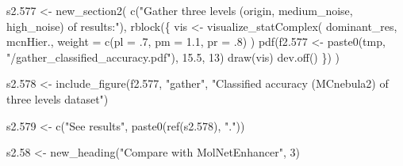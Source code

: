 \documentclass[
]{article}
\newenvironment{Shaded}{\begin{snugshade}}{\end{snugshade}}
\newcommand{\AttributeTok}[1]{\textcolor[rgb]{0.77,0.63,0.00}{#1}}
\newcommand{\DecValTok}[1]{\textcolor[rgb]{0.00,0.00,0.81}{#1}}
\newcommand{\FloatTok}[1]{\textcolor[rgb]{0.00,0.00,0.81}{#1}}
\newcommand{\FunctionTok}[1]{\textcolor[rgb]{0.00,0.00,0.00}{#1}}
\newcommand{\NormalTok}[1]{#1}
\newcommand{\OtherTok}[1]{\textcolor[rgb]{0.56,0.35,0.01}{#1}}
\newcommand{\StringTok}[1]{\textcolor[rgb]{0.31,0.60,0.02}{#1}}
\begin{document}
\begin{Shaded}
\begin{Highlighting}[]
\NormalTok{s2}\FloatTok{.577} \OtherTok{\textless{}{-}} \FunctionTok{new\_section2}\NormalTok{(}
  \FunctionTok{c}\NormalTok{(}\StringTok{"Gather three levels (origin, medium\_noise, high\_noise) of results:"}\NormalTok{),}
  \FunctionTok{rblock}\NormalTok{(\{}
\NormalTok{    vis }\OtherTok{\textless{}{-}} \FunctionTok{visualize\_statComplex}\NormalTok{(}
\NormalTok{      dominant\_res, mcnHier., }\AttributeTok{weight =} \FunctionTok{c}\NormalTok{(}\AttributeTok{pl =}\NormalTok{ .}\DecValTok{7}\NormalTok{, }\AttributeTok{pm =} \FloatTok{1.1}\NormalTok{, }\AttributeTok{pr =}\NormalTok{ .}\DecValTok{8}\NormalTok{)}
\NormalTok{    )}
    \FunctionTok{pdf}\NormalTok{(f2}\FloatTok{.577} \OtherTok{\textless{}{-}} \FunctionTok{paste0}\NormalTok{(tmp, }\StringTok{"/gather\_classified\_accuracy.pdf"}\NormalTok{), }\FloatTok{15.5}\NormalTok{, }\DecValTok{13}\NormalTok{)}
    \FunctionTok{draw}\NormalTok{(vis)}
    \FunctionTok{dev.off}\NormalTok{()}
\NormalTok{  \})}
\NormalTok{)}

\NormalTok{s2}\FloatTok{.578} \OtherTok{\textless{}{-}} \FunctionTok{include\_figure}\NormalTok{(f2}\FloatTok{.577}\NormalTok{, }\StringTok{"gather"}\NormalTok{,}
  \StringTok{"Classified accuracy (MCnebula2) of three levels dataset"}\NormalTok{)}

\NormalTok{s2}\FloatTok{.579} \OtherTok{\textless{}{-}} \FunctionTok{c}\NormalTok{(}\StringTok{"See results"}\NormalTok{, }\FunctionTok{paste0}\NormalTok{(}\FunctionTok{ref}\NormalTok{(s2}\FloatTok{.578}\NormalTok{), }\StringTok{"."}\NormalTok{))}

\NormalTok{s2}\FloatTok{.58} \OtherTok{\textless{}{-}} \FunctionTok{new\_heading}\NormalTok{(}\StringTok{"Compare with MolNetEnhancer"}\NormalTok{, }\DecValTok{3}\NormalTok{)}


\end{Highlighting}
\end{Shaded}
\end{document}
